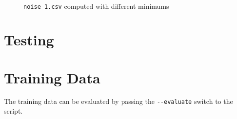 \documentclass[11pt,a4paper]{scrartcl}
\begin{document}
\begin{figure}
	\centering
	\qquad
	\caption{\lstinline|noise_1.csv| computed with different minimums}
	\label{fig:noise_1}
\end{figure}

\section{Testing}


\section{Training Data}

The training data can be evaluated by passing the \lstinline|--evaluate| switch to the script.


\printbibliography
\end{document}
